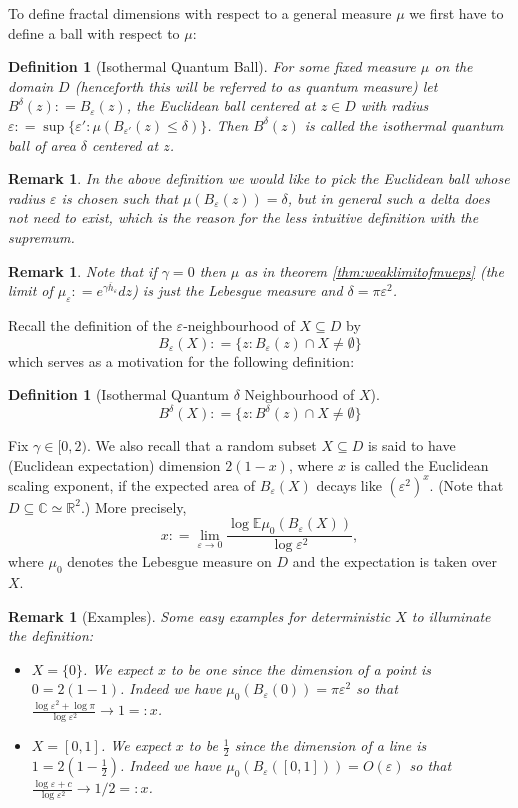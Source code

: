 \documentclass[11pt,reqno]{amsart}
\numberwithin{equation}{section}
\newtheorem{defi}[thm]{Definition}
\newtheorem{rem}[thm]{Remark}
\newcommand{\deq}{\mathrel{\mathop:}=}
\newcommand{\eps}{\varepsilon}
\begin{document}
To define fractal dimensions with respect to a general measure $\mu$ we first have to define a ball with respect to $\mu$:
\begin{defi}[Isothermal Quantum Ball]
	For some fixed measure $\mu$ on the domain $D$ (henceforth this will be referred to as \emph{quantum measure}) let $B^\delta(z)\deq B_\eps(z)$, the Euclidean ball centered at $z\in D$ with radius $\eps\deq\sup\{\eps':\mu(B_{\eps'}(z)\leq\delta)\}$. Then $B^\delta(z)$ is called the \emph{isothermal quantum ball} of area $\delta$ centered at $z$.
\end{defi}
\begin{rem}
	In the above definition we would like to pick the Euclidean ball whose radius $\eps$ is chosen such that $\mu(B_\eps(z))=\delta$, but in general such a delta does not need to exist, which is the reason for the less intuitive definition with the supremum.
\end{rem}
\begin{rem}
	Note that if $\gamma=0$ then $\mu$ as in theorem \ref{thm:weaklimitofmueps} (the limit of $\mu_\eps\deq e^{\gamma\overline h_\eps}dz$) is just the Lebesgue measure and $\delta=\pi\eps^2$.
\end{rem}
Recall the definition of the $\eps$-neighbourhood of $X\subseteq D$ by $$B_\eps(X)\deq \{z:B_\eps(z)\cap X\neq\emptyset \}$$ which serves as a motivation for the following definition:
\begin{defi}[Isothermal Quantum $\delta$ Neighbourhood of $X$]
	$$B^\delta(X)\deq \{z:B^\delta(z)\cap X\neq\emptyset\}$$
\end{defi}

Fix $\gamma\in[0,2)$. We also recall that a random subset $X\subseteq D$ is said to have (Euclidean expectation) dimension $2(1-x)$, where $x$ is called the Euclidean scaling exponent, if the expected area of $B_\eps(X)$ decays like $(\eps^2)^x$. (Note that $D\subseteq\mathbb C\simeq\mathbb R^2$.) More precisely, $$x\deq \lim_{\eps\rightarrow 0}\frac{\log \mathbb E\mu_0(B_\eps(X))}{\log\eps^2},$$ where $\mu_0$ denotes the Lebesgue measure on $D$ and the expectation is taken over $X$.
\begin{rem}[Examples]
	Some easy examples for deterministic $X$ to illuminate the definition:
	\begin{itemize}
		\item $X=\{0\}$. We expect $x$ to be one since the dimension of a point is $0 = 2(1-1)$. Indeed we have $\mu_0(B_\eps(0))=\pi\eps^2$ so that $\frac{\log\eps^2+\log\pi}{\log\eps^2}\rightarrow 1=:x$.
		\item $X=[0,1]$. We expect $x$ to be $\frac{1}{2}$ since the dimension of a line is $1=2(1-\frac{1}{2})$. Indeed we have $\mu_0(B_\eps([0,1]))=O(\eps)$ so that $\frac{\log\eps+c}{\log\eps^2}\rightarrow 1/2=:x$.
	\end{itemize}
\end{rem}
\end{document}
